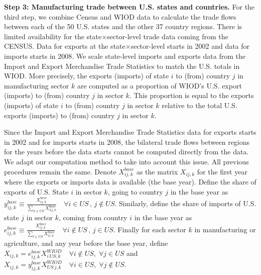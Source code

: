 \documentclass[12pt]{article}
\begin{document}
\textbf{Step 3: Manufacturing trade between U.S. states and countries.} For the third step, we combine Census and WIOD data to calculate the trade flows between each of the 50 U.S. states and the other 37 country regions. There is limited availability for the state$\times$sector-level trade data coming from the  CENSUS. Data for exports at the state$\times$sector-level starts in 2002 and data for imports starts in 2008. We scale state-level imports and exports data from the Import and Export Merchandise Trade Statistics to match the U.S. totals in WIOD. More precisely, the exports (imports) of state $i$ to (from) country $j$ in manufacturing sector $k$ are computed as a proportion of WIOD's U.S. export (imports) to (from) country $j$ in sector $k$. This proportion is equal to the exports (imports) of state $i$ to (from) country $j$ in sector $k$ relative to the total U.S. exports (imports) to (from) country $j$ in sector $k$.

Since the Import and Export Merchandise Trade Statistics data for exports starts in 2002 and for imports starts in 2008, the bilateral trade flows between regions for the years before the data starts cannot be computed directly from the data. We adapt our computation method to take into account this issue. All previous procedures remain the same. Denote $X_{ij,k}^{base}$ as the matrix $X_{ij,k}$ for the first year where the exports or imports data is available (the base year). Define the share of exports of U.S. State $i$ in sector $k$, going to country $j$ in the base year as $y_{ij,k}^{base}\equiv\tfrac{X_{ij,k}^{base}}{\sum_{h\in US}X_{hj,k}^{base}} \quad \forall i\in US \, , \, j\notin US.$ Similarly, define the share of imports of U.S. state $j$ in sector $k$, coming from country $i$ in the base year as $e_{ij,k}^{base}\equiv\tfrac{X_{ij,k}^{base}}{\sum_{l\in US}X_{il,k}^{base}} \quad \forall i\notin US \, , \, j\in US.$ Finally for each sector $k$ in manufacturing or agriculture, and any year before the base year, define $X_{ij,k}= e_{ij,k}^{base}X_{i\,US,k}^{WIOD} \quad \forall i\notin US, \; \forall j\in US$ and $X_{ij,k}=y_{ij,k}^{base}X_{US\,j,k}^{WIOD} \quad \forall i\in US, \; \forall j\notin US$.
\end{document}
